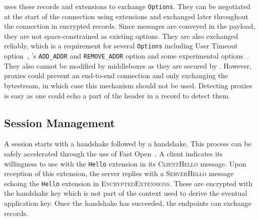\tcpls uses these records and extensions to exchange \tcp \texttt{Options}. 
They can be negotiated at the start of the connection using \tls extensions and 
exchanged later throughout the connection in encrypted \tcpls records. 
Since \tls messages are conveyed in the \tcp payload, they are not 
space-constrained as existing \tcp options.
They are also exchanged reliably, which is a requirement for several \tcp 
\texttt{Options} including \tcp User Timeout option~\cite{rfc5482}, \mptcp's 
\texttt{ADD\_ADDR} and \texttt{REMOVE\_ADDR} option and some experimental \tcp 
options~\cite{rfc6994}. They also cannot be modified by middleboxes as they are 
secured by \tls. However, \tcp proxies could prevent an end-to-end \tcp 
connection and only exchanging the \tcp bytestream, in which case this 
mechanism should not be used. Detecting \tcp 
proxies is easy as one could echo a part of the \tcp header in a \tcpls record 
to detect them.



\subsection{\tcpls Session Management}\label{design.start}

A \tcpls session starts with a \tcp handshake followed by a \tls handshake.
This process can be safely accelerated through the use of \tcp Fast Open~\cite{rfc7413}.
A \tcpls client
indicates its willingness to use \tcpls with the \tcpls \texttt{Hello} extension
in its \tls \textsc{ClientHello} message. Upon reception of this extension, the \tcpls server replies with a \tls \textsc{ServerHello} message echoing the \tcpls \texttt{Hello} extension in \tls \textsc{EncryptedExtensions}.
These are encrypted with the handshake key which is not part of the context used to derive the eventual application key.
Once the \tls handshake has succeeded, the endpoints can exchange \tcpls
records.

